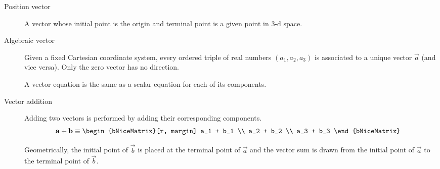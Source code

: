 \begin{description}
    \item[Position vector] A vector whose initial point is the origin and terminal point
        is a given point in 3-d space.

    \item[Algebraic vector] Given a fixed Cartesian coordinate system, every ordered
        triple of real numbers $ (a_1, a_2, a_3) $ is associated to a unique vector
        $ \vec{a} $ (and vice versa). Only the zero vector has no direction. \par
        A vector equation is the same as a scalar equation for each of its components.

    \item[Vector addition] Adding two vectors is performed by adding their
        corresponding components.
        \begin{align}
            \vec{a} + \vec{b} & \equiv \begin{bNiceMatrix}[r, margin]
                                           a_1 + b_1 \\ a_2 + b_2 \\ a_3 + b_3
                                       \end{bNiceMatrix}
        \end{align}

        Geometrically, the initial point of $ \vec{b} $ is placed at the terminal point
        of $ \vec{a} $ and the vector sum is drawn from the initial point of $ \vec{a} $
        to the terminal point of $ \vec{b} $.

        \begin{figure}[H]
            \centering
            \hspace{2in}
        \end{figure}


\end{description}
